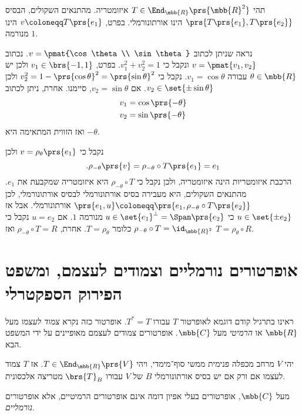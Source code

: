 \documentclass[a4paper,10pt,twoside,openany]{book}
\begin{document}
\begin{solution}
תהי
$T \in \End_{\mbb{R}}\prs{\mbb{R}^2}$
איזומטריה.
מהתנאים השקולים, הבסיס
$\prs{T\prs{e_1}, T\prs{e_2}}$
הינו אורתונורמלי.
בפרט,
$v \coloneqq T\prs{e_1}$
הינו מנורמה
$1$.

נראה שניתן לכתוב
$v = \pmat{\cos\theta \\ \sin\theta}$.
נכתוב
$v = \pmat{v_1, v_2}$
ונקבל כי
$v_1^2 + v_2^2 = 1$.
בפרט,
$v_1 \in \brs{-1,1}$
ולכן יש
$\theta \in \mbb{R}$
עבורה
$v_1 = \cos\theta$.
נקבל כי
$v_2^2 = 1 - \prs{\cos \theta}^2 = \prs{\sin \theta}^2$
ולכן
$v_2 \in \set{\pm \sin \theta}$.
אם
$v_2 = \sin\theta$,
סיימנו.
אחרת, ניתן לכתוב
\begin{align*}
    v_1 &= \cos\prs{-\theta} \\
    v_2 &= \sin\prs{-\theta}
\end{align*}
ואז הזווית המתאימה היא
$-\theta$.

נקבל כי
$v = \rho_\theta\prs{e_1}$
ולכן
\[\text{.} \rho_{-\theta}\prs{v} = \rho_{-\theta} \circ T \prs{e_1} = e_1\]
הרכבת איזומטריות הינה איזומטריה, ולכן נקבל כי
$\rho_{-\theta} \circ T$
היא איזומטריה שמקבעת את
$e_1$.
מהתנאים השקולים, היא מעבירה בסיס אורתונורמלי לבסיס אורתונורמלי, לכן
$\prs{e_1, u} \coloneqq \prs{e_1, \rho_{-\theta} \circ T\prs{e_2}}$
אורתונורמלי.
אבל אז
$u \in \set{\pm e_2}$
כי
$u \in \set{e_1}^\perp = \Span\prs{e_2}$
מנורמה
$1$.
אם
$u = e_2$
נקבל כי
$\rho_{-\theta} \circ T = \id_{\mbb{R}^2}$
כלומר
$T = \rho_{\theta}$.
אחרת,
$\rho_{-\theta} \circ T = R$
ואז
$T = \rho_{\theta} \circ R$.
\end{solution}

\section{אופרטורים נורמליים וצמודים לעצמם, ומשפט הפירוק הספקטרלי}

ראינו בתרגיל קודם דוגמא לאופרטור
$T$
עבורו
$T^* = T$.
אופרטור כזה נקרא
\emph{צמוד לעצמו}
מעל
$\mbb{R}$
או
\emph{הרמיטי}
מעל
$\mbb{C}$.
אופרטורים צמודים לעצמם מאופיינים על ידי המשפט הבא.

\begin{theorem}
יהי
$V$
מרחב מכפלה פנימית ממשי סוף־מימדי, ויהי
$T \in \End_{\mbb{R}}\prs{V}$.
אז
$T$
צמוד לעצמו אם ורק אם יש בסיס אורתונורמלי
$B$
של
$V$
עבורו
$\brs{T}_B$
מטריצה אלכסונית.
\end{theorem}

מעל
$\mbb{C}$,
אופרטורים בעלי אפיון דומה אינם אופרטורים הרמיטיים, אלא אופרטורים
\emph{נורמליים}.
\end{document}
